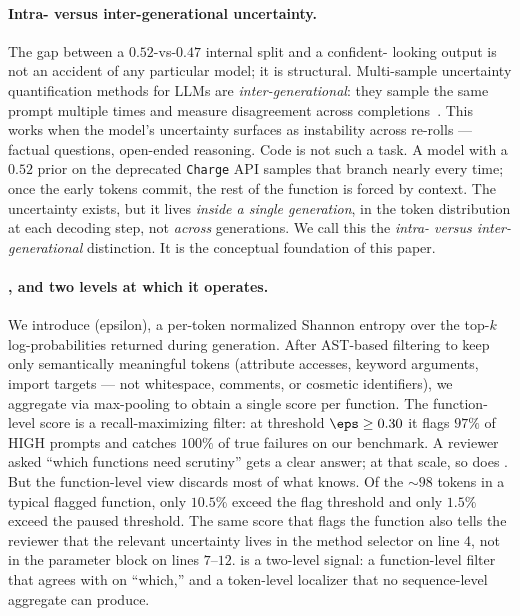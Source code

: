 \paragraph{Intra- versus inter-generational uncertainty.}
The gap between a $0.52$-vs-$0.47$ internal split and a confident-%
looking output is not an accident of any particular model; it is
structural. Multi-sample uncertainty quantification methods for LLMs
are \emph{inter-generational}: they sample the same prompt multiple
times and measure disagreement across completions~\cite{kuhn2023semantic,%
uqlm2024,sharma2025multisample}. This works when the model's
uncertainty surfaces as instability across re-rolls --- factual
questions, open-ended reasoning. Code is not such a task. A model
with a $0.52$ prior on the deprecated \texttt{Charge} API samples that
branch nearly every time; once the early tokens commit, the rest of
the function is forced by context. The uncertainty exists, but it
lives \emph{inside a single generation}, in the token distribution at
each decoding step, not \emph{across} generations. We call this the
\emph{intra- versus inter-generational} distinction. It is the
conceptual foundation of this paper.

\paragraph{\eps, and two levels at which it operates.}
We introduce \eps (epsilon), a per-token normalized Shannon entropy
over the top-$k$ log-probabilities returned during generation. After
AST-based filtering to keep only semantically meaningful tokens
(attribute accesses, keyword arguments, import targets --- not
whitespace, comments, or cosmetic identifiers), we aggregate via
max-pooling to obtain a single score per function. The function-level
score is a recall-maximizing filter: at threshold $\eps \ge 0.30$ it
flags $97\%$ of HIGH prompts and catches $100\%$ of true failures on
our benchmark. A reviewer asked ``which functions need scrutiny''
gets a clear answer; at that scale, so does \papg. But the
function-level view discards most of what \eps knows. Of the
$\sim 98$ tokens in a typical flagged function, only $10.5\%$ exceed
the flag threshold and only $1.5\%$ exceed the paused threshold. The
same score that flags the function also tells the reviewer that the
relevant uncertainty lives in the method selector on line $4$, not in
the parameter block on lines $7$--$12$. \eps is a two-level signal: a
function-level filter that agrees with \papg on ``which,'' and a
token-level localizer that no sequence-level aggregate can produce.

